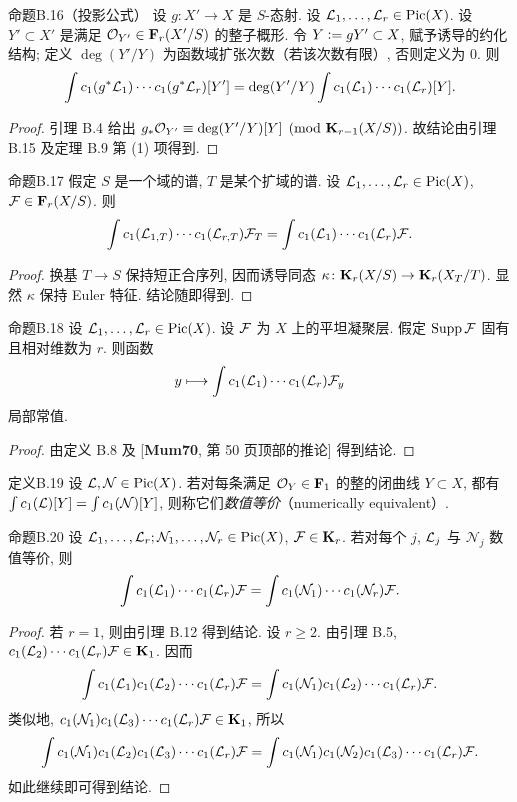 \begin{origstatement}{命题}{B.16（投影公式）}\label{appB:16}
设 $g\colon X'\to X$ 是 $S$-态射. 设 $\mathcal L_1,\ldots,\mathcal L_r\in\operatorname{Pic}(X)$. 设 $Y'\subset X'$ 是满足 $\mathcal O_{Y'}\in\mathbf F_r(X'/S)$ 的整子概形. 令 $Y\mathrel{\mathop:}= gY'\subset X$, 赋予诱导的约化结构; 定义 $\deg(Y'/Y)$ 为函数域扩张次数（若该次数有限）, 否则定义为 $0$. 则
\[\int c_1(g^*\mathcal L_1)\cdots c_1(g^*\mathcal L_r)[Y']=\deg(Y'/Y)\int c_1(\mathcal L_1)\cdots c_1(\mathcal L_r)[Y].\]
\end{origstatement}
\begin{proof}
引理 B.4 给出 $g_*\mathcal O_{Y'}\equiv\deg(Y'/Y)[Y]\pmod{\mathbf K_{r-1}(X/S)}$. 故结论由引理 B.15 及定理 B.9 第 (1) 项得到.
\end{proof}

\begin{origstatement}{命题}{B.17}\label{appB:17}
假定 $S$ 是一个域的谱, $T$ 是某个扩域的谱. 设 $\mathcal L_1,\ldots,\mathcal L_r\in\operatorname{Pic}(X)$, $\mathcal F\in\mathbf F_r(X/S)$. 则
\[\int c_1(\mathcal L_{1,T})\cdots c_1(\mathcal L_{r,T})\mathcal F_T=\int c_1(\mathcal L_1)\cdots c_1(\mathcal L_r)\mathcal F.\]
\end{origstatement}
\begin{proof}
换基 $T\to S$ 保持短正合序列, 因而诱导同态 $\kappa\colon\mathbf K_r(X/S)\to\mathbf K_r(X_T/T)$. 显然 $\kappa$ 保持 Euler 特征. 结论随即得到.
\end{proof}
\begin{origstatement}{命题}{B.18}\label{appB:18}
设 $\mathcal L_1,\ldots,\mathcal L_r\in\operatorname{Pic}(X)$. 设 $\mathcal F$ 为 $X$ 上的平坦凝聚层. 假定 $\operatorname{Supp}\mathcal F$ 固有且相对维数为 $r$. 则函数
\[y\longmapsto\int c_1(\mathcal L_1)\cdots c_1(\mathcal L_r)\mathcal F_y\]
局部常值.
\end{origstatement}
\begin{proof}
由定义 B.8 及 [\textbf{Mum70}, 第 50 页顶部的推论] 得到结论.
\end{proof}

\begin{origstatement}{定义}{B.19}\label{appB:19}
设 $\mathcal L,\mathcal N\in\operatorname{Pic}(X)$. 若对每条满足 $\mathcal O_Y\in\mathbf F_1$ 的整的闭曲线 $Y\subset X$, 都有 $\int c_1(\mathcal L)[Y]=\int c_1(\mathcal N)[Y]$, 则称它们\emph{数值等价}（numerically equivalent）.
\end{origstatement}

\begin{origstatement}{命题}{B.20}\label{appB:20}
设 $\mathcal L_1,\ldots,\mathcal L_r;\mathcal N_1,\ldots,\mathcal N_r\in\operatorname{Pic}(X)$, $\mathcal F\in\mathbf K_r$. 若对每个 $j$, $\mathcal L_j$ 与 $\mathcal N_j$ 数值等价, 则
\[\int c_1(\mathcal L_1)\cdots c_1(\mathcal L_r)\mathcal F=\int c_1(\mathcal N_1)\cdots c_1(\mathcal N_r)\mathcal F.\]
\end{origstatement}
\begin{proof}
若 $r=1$, 则由引理 B.12 得到结论. 设 $r\ge2$. 由引理 B.5, $c_1(\mathcal L_2)\cdots c_1(\mathcal L_r)\mathcal F\in\mathbf K_1$. 因而
\[\int c_1(\mathcal L_1)c_1(\mathcal L_2)\cdots c_1(\mathcal L_r)\mathcal F=\int c_1(\mathcal N_1)c_1(\mathcal L_2)\cdots c_1(\mathcal L_r)\mathcal F.\]
类似地, $c_1(\mathcal N_1)c_1(\mathcal L_3)\cdots c_1(\mathcal L_r)\mathcal F\in\mathbf K_1$, 所以
\[\int c_1(\mathcal N_1)c_1(\mathcal L_2)c_1(\mathcal L_3)\cdots c_1(\mathcal L_r)\mathcal F
=\int c_1(\mathcal N_1)c_1(\mathcal N_2)c_1(\mathcal L_3)\cdots c_1(\mathcal L_r)\mathcal F.\]
如此继续即可得到结论.
\end{proof}


